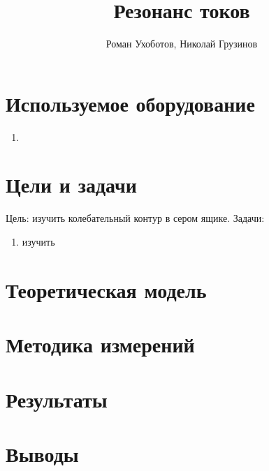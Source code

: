 \documentclass[a4paper, 12pt]{article}
\title{Резонанс токов}
\author{Роман Ухоботов, Николай Грузинов}
\date{}%
\begin{document}
\maketitle

\section{Используемое оборудование}
\begin{enumerate}
\item 
\end{enumerate}

\section{Цели и задачи}
Цель: изучить колебательный контур в сером ящике.
Задачи:
\begin{enumerate}
\item изучить
\end{enumerate}

\section{Теоретическая модель}
\section{Методика измерений}
\section{Результаты}
\section{Выводы}
\end{document}
